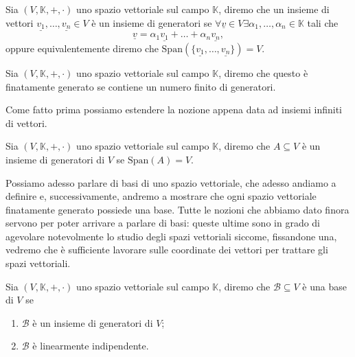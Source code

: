 \begin{definition}
    Sia $(V, \mathbb{K}, +, \cdot)$ uno spazio vettoriale sul campo $\mathbb{K}$, diremo che un insieme di vettori $\underline{v_1}, \ldots, \underline{v_n} \in V$ è un insieme di generatori se $\forall \underline{v} \in V \exists \alpha_1, \ldots, \alpha_n \in \mathbb{K}$ tali che
    $$
        \underline{v} = \alpha_1 \underline{v_1} + \ldots + \alpha_n \underline{v_n},
    $$
    oppure equivalentemente diremo che $\text{Span}(\{ \underline{v_1}, \ldots, \underline{v_n} \}) = V$.
\end{definition}
\begin{definition}
    Sia $(V, \mathbb{K}, +, \cdot)$ uno spazio vettoriale sul campo $\mathbb{K}$, diremo che questo è finatamente generato se contiene un numero finito di generatori. 
\end{definition}
Come fatto prima possiamo estendere la nozione appena data ad insiemi infiniti di vettori.
\begin{definition}
    Sia $(V, \mathbb{K}, +, \cdot)$ uno spazio vettoriale sul campo $\mathbb{K}$, diremo che $A \subseteq V$ è un insieme di generatori di $V$ se $\text{Span}(A)=V$.
\end{definition}
Possiamo adesso parlare di basi di uno spazio vettoriale, che adesso andiamo a definire e, successivamente, andremo a mostrare che ogni spazio vettoriale finatamente generato possiede una base. Tutte le nozioni che abbiamo dato finora servono per poter arrivare a parlare di basi: queste ultime sono in grado di agevolare notevolmente lo studio degli spazi vettoriali
siccome, fissandone una, vedremo che è sufficiente lavorare sulle coordinate dei vettori per trattare gli spazi vettoriali.
\begin{definition}
    Sia $(V, \mathbb{K}, +, \cdot)$ uno spazio vettoriale sul campo $\mathbb{K}$, diremo che $\mathcal{B} \subseteq V$ è una base di $V$ se
    \begin{enumerate}[label=\protect\circled{\arabic*}]
        \item $\mathcal{B}$ è un insieme di generatori di $V$;
        \item $\mathcal{B}$ è linearmente indipendente.
    \end{enumerate}
\end{definition}
